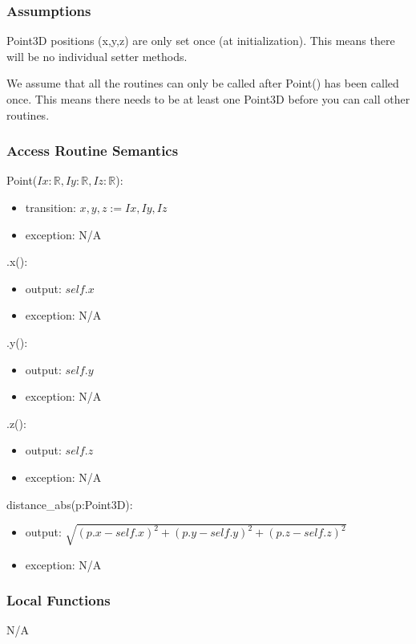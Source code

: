 \documentclass[12pt, titlepage]{article}
\begin{document}
\subsubsection{Assumptions}
Point3D positions (x,y,z) are only set once (at initialization). This means 
there will be no individual setter methods.

We assume that all the routines can only be called after Point() has been 
called once. This means there needs to be at least one Point3D before you can 
call other routines.

\subsubsection{Access Routine Semantics}
\noindent Point($Ix: \mathbb{R}, Iy: \mathbb{R}, Iz: \mathbb{R}$):
\begin{itemize}
	\item transition: $x, y, z := Ix, Iy, Iz$
	\item exception: N/A
\end{itemize}

\noindent .x():
\begin{itemize}
	\item output: $self.x$
	\item exception: N/A
\end{itemize}

\noindent .y():
\begin{itemize}
	\item output: $self.y$
	\item exception: N/A
\end{itemize}

\noindent .z():
\begin{itemize}
	\item output: $self.z$
	\item exception: N/A
\end{itemize} 

\noindent distance\_abs(p:Point3D):
\begin{itemize}
	\item output: $ \sqrt{(p.x-self.x)^2 + (p.y-self.y)^2 + (p.z-self.z)^2}$
	\item exception: N/A
\end{itemize} 

\subsubsection{Local Functions}
N/A
\end{document}
